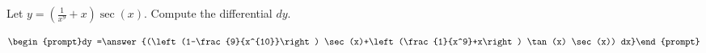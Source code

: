 \documentclass{ximera}
\author{Bart Snapp}
\begin{document}
\begin{exercise}

Let $y= \left(\frac{1}{x^9}+x\right) \sec (x)$. Compute the differential $dy$.

\[
\begin{prompt}dy =\answer{(\left(1-\frac{9}{x^{10}}\right) \sec (x)+\left(\frac{1}{x^9}+x\right) \tan (x) \sec (x)) dx}\end{prompt}
\]
\end{exercise}
\end{document}
